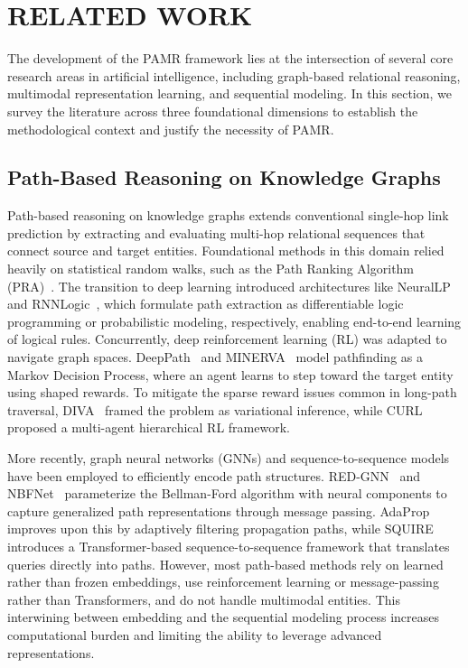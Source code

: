 \documentclass[runningheads]{llncs}
\begin{document}
\section{\uppercase{Related Work}}
\label{sec:related-work}

The development of the PAMR framework lies at the intersection of several core research areas in artificial intelligence, including graph-based relational reasoning, multimodal representation learning, and sequential modeling. In this section, we survey the literature across three foundational dimensions to establish the methodological context and justify the necessity of PAMR.

\subsection{Path-Based Reasoning on Knowledge Graphs}
\label{sec:rw-path-reasoning}

Path-based reasoning on knowledge graphs extends conventional single-hop link prediction by extracting and evaluating multi-hop relational sequences that connect source and target entities. Foundational methods in this domain relied heavily on statistical random walks, such as the Path Ranking Algorithm (PRA)~\cite{lao2011random}. The transition to deep learning introduced architectures like NeuralLP~\cite{yang2017differentiable} and RNNLogic~\cite{qu2021rnnlogic}, which formulate path extraction as differentiable logic programming or probabilistic modeling, respectively, enabling end-to-end learning of logical rules. Concurrently, deep reinforcement learning (RL) was adapted to navigate graph spaces. DeepPath~\cite{xiong2017deeppath} and MINERVA~\cite{das2018go} model pathfinding as a Markov Decision Process, where an agent learns to step toward the target entity using shaped rewards. To mitigate the sparse reward issues common in long-path traversal, DIVA~\cite{chen2018variational} framed the problem as variational inference, while CURL~\cite{zhang2022learning} proposed a multi-agent hierarchical RL framework.

More recently, graph neural networks (GNNs) and sequence-to-sequence models have been employed to efficiently encode path structures. RED-GNN~\cite{zhang2022knowledge} and NBFNet~\cite{zhu2021neural} parameterize the Bellman-Ford algorithm with neural components to capture generalized path representations through message passing. AdaProp~\cite{zhang2023adaprop} improves upon this by adaptively filtering propagation paths, while SQUIRE~\cite{bai2022squire} introduces a Transformer-based sequence-to-sequence framework that translates queries directly into paths. However, most path-based methods rely on learned rather than frozen embeddings, use reinforcement learning or message-passing rather than Transformers, and do not handle multimodal entities. This interwining between embedding and the sequential modeling process increases computational burden and limiting the ability to leverage advanced representations.
\end{document}
